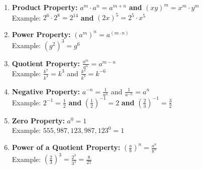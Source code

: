 \documentclass[12pt]{article}
\begin{document}
\begin{enumerate}
\setlength\itemsep{1cm}

	\item \textbf{Product Property:} $a^m \cdot a^n= a^{m+n}$\hspace{1cm} \textbf{and} \hspace{1cm} $(xy)^m=x^m \cdot y^m$ \\
	
		\hspace{.6in} Example: $2^6 \cdot 2^8=2^{14}$\hspace{1cm}   \textbf{ and}  \hspace{1cm}  $(2x)^{5}=2^5 \cdot x^5$\\ 
	
	\item \textbf{Power Property:} $\left(a^m \right)^n = a^{(m \cdot n)}$\\
	
		\hspace{.6in} Example: $\left(g^2\right)^3=g^6$\\ 
	
	\item \textbf{Quotient Property:} $\frac{a^m}{a^n}=a^{m-n}$\\
	
		\hspace{.6in} Example: $\frac{k^7}{k^4} = k^3$ and $\frac{k^2}{k^8}=k^{-6}$\\ 
	
	\item \textbf{Negative Property:} $a^{-n}=\frac{1}{a^n}$ and $\frac{1}{a^{-n}}=a^{n}$ \\
	
		\hspace{.6in} Example: $2^{-1}=\frac{1}{2}$\hspace{1cm} \textbf{and} \hspace{1cm} $\left(\frac{1}{2}\right)^{-1}=2$ \hspace{1cm} \textbf{and} \hspace{1cm} $\left(\frac{2}{3}\right)^{-1}=\frac{3}{2}$\\ 
	
	\item \textbf{Zero Property:} $a^0=1$\\
		
		\hspace{.6in} Example: $555,987,123,987,123^0=1$\\ 
	
	\item \textbf{Power of a Quotient Property:} $\left(\frac{a}{b}\right)^n=\frac{a^n}{b^n}$\\
	
		\hspace{.6in} Example: $\left(\frac{2}{3}\right)^3=\frac{2^3}{3^3}=\frac{8}{27}$ \\

\end{enumerate}
\end{document}
